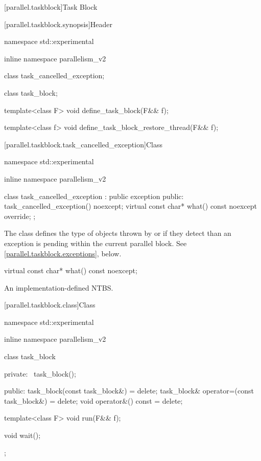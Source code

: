 
[parallel.taskblock]{Task Block}

[parallel.taskblock.synopsis]{Header }

\begin{codeblock}
namespace std::experimental {
inline namespace parallelism_v2 {
  class task_cancelled_exception;

  class task_block;

  template<class F>
    void define_task_block(F&& f);

  template<class f>
    void define_task_block_restore_thread(F&& f);
}
}
\end{codeblock}

[parallel.taskblock.task_cancelled_exception]{Class }

\begin{codeblock}
namespace std::experimental {
inline namespace parallelism_v2 {

  class task_cancelled_exception : public exception
  {
  public:
    task_cancelled_exception() noexcept;
    virtual const char* what() const noexcept override;
  };
}
}
\end{codeblock}

\pnum
The class  defines the type of objects
thrown by  or  if they detect
than an exception is pending within the current parallel block. See
\ref{parallel.taskblock.exceptions}, below.

\begin{itemdecl}
virtual const char* what() const noexcept;
\end{itemdecl}

\begin{itemdescr}
\pnum
\returns An implementation-defined NTBS.
\end{itemdescr}

[parallel.taskblock.class]{Class }

\begin{codeblock}
namespace std::experimental {
inline namespace parallelism_v2 {

  class task_block
  {
  private:
    ~task_block();

  public:
    task_block(const task_block&) = delete;
    task_block& operator=(const task_block&) = delete;
    void operator&() const = delete;

    template<class F>
      void run(F&& f);

    void wait();
  };
}
}
\end{codeblock}

